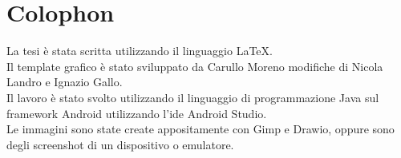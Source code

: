 %
%
\chapter*{Colophon}

La tesi è stata scritta utilizzando il linguaggio LaTeX.\\
Il template grafico è stato sviluppato da Carullo Moreno modifiche di Nicola Landro e Ignazio Gallo.\\
Il lavoro è stato svolto utilizzando il linguaggio di programmazione Java sul framework Android utilizzando l'ide Android Studio.\\
Le immagini sono state create appositamente con Gimp e Drawio, oppure sono degli screenshot di un dispositivo o emulatore.